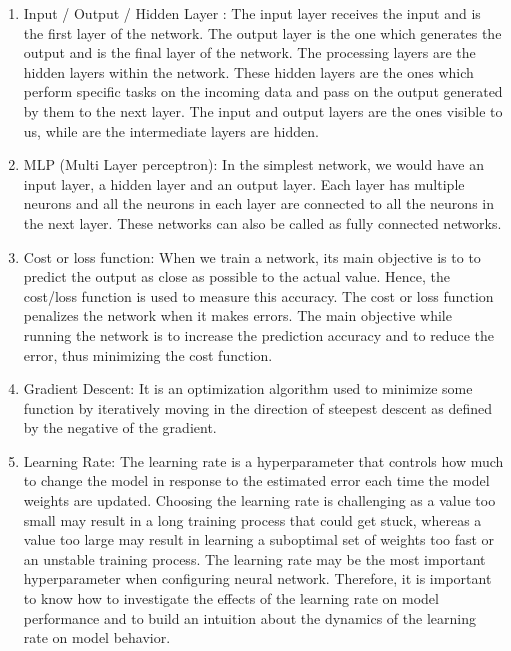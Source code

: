 \documentclass[letterpaper,10pt,english]{jupyterBook}
\begin{document}
\begin{enumerate}
%
\item {} 
\sphinxAtStartPar
Input / Output / Hidden Layer : The input layer receives the input
and is the first layer of the network. The output layer is the one which
generates the output and is the final layer of the network. The
processing layers are the hidden layers within the network. These hidden
layers are the ones which perform specific tasks on the incoming data
and pass on the output generated by them to the next layer. The input
and output layers are the ones visible to us, while are the intermediate
layers are hidden.

\item {} 
\sphinxAtStartPar
MLP (Multi Layer perceptron): In the simplest network, we would have
an input layer, a hidden layer and an output layer. Each layer has
multiple neurons and all the neurons in each layer are connected to all
the neurons in the next layer. These networks can also be called as
fully connected networks.

\item {} 
\sphinxAtStartPar
Cost or loss function: When we train a network, its main objective is to  to
predict the output as close as possible to the actual value. Hence, the
cost/loss function is used to measure this accuracy. The cost or loss
function penalizes the network when it makes errors. The main objective
while running the network is to increase the prediction accuracy and to
reduce the error, thus minimizing the cost function.

\item {} 
\sphinxAtStartPar
Gradient Descent: It is an optimization algorithm used to minimize
some function by iteratively moving in the direction of steepest descent
as defined by the negative of the gradient.

\item {} 
\sphinxAtStartPar
Learning Rate: The learning rate is a hyperparameter that controls
how much to change the model in response to the estimated error each
time the model weights are updated. Choosing the learning rate is
challenging as a value too small may result in a long training process
that could get stuck, whereas a value too large may result in learning a
sub\sphinxhyphen{}optimal set of weights too fast or an unstable training process. The
learning rate may be the most important hyperparameter when configuring
neural network. Therefore, it is important  to know how to investigate
the effects of the learning rate on model performance and to build an
intuition about the dynamics of the learning rate on model behavior.


\end{enumerate}
\end{document}
